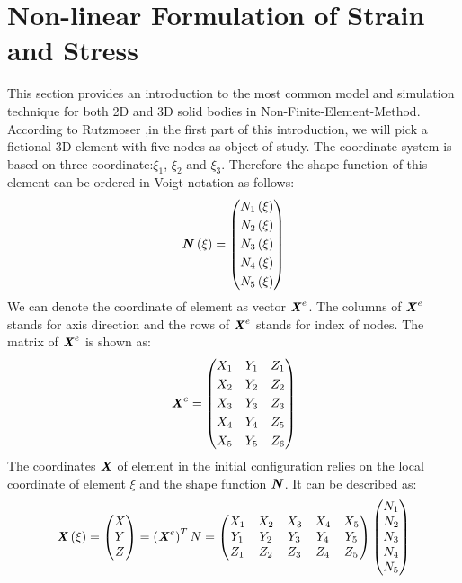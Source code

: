 \section{Non-linear Formulation of Strain and Stress}
This section provides an introduction to the most common model and simulation technique for both 2D and 3D solid bodies in Non-Finite-Element-Method. According to Rutzmoser \cite{Johannes} ,in the first part of this introduction, we will pick a fictional 3D element with five nodes as object of study. The coordinate system is based on three coordinate:$\xi_1$, $\xi_2$ and $\xi_3$. Therefore the shape function of this element can be ordered in Voigt notation as follows:
\begin{equation}
 \textbf{\textit{N}}\left(\xi\right) = \begin{pmatrix}
 N_1\left(\xi\right)           \\[0.3em]
 N_2\left(\xi\right)            \\[0.3em]
 N_3\left(\xi\right)           \\[0.3em]
 N_4\left(\xi\right)         \\[0.3em]
 N_5\left(\xi\right)                            
\end{pmatrix}
\end{equation}
We can denote the coordinate of element as vector $\textbf{\textit{X}}^e$. The columns of $\textbf{\textit{X}}^e$ stands for axis direction and the rows of $\textbf{\textit{X}}^e$ stands for index of nodes. The matrix of $\textbf{\textit{X}}^e$ is shown as:
\begin{equation}
\textbf{\textit{X}}^e = \begin{pmatrix}
X_1 & Y_1 & Z_1           \\[0.3em]
X_2 & Y_2 & Z_2             \\[0.3em]
X_3 & Y_3 & Z_3           \\[0.3em]
X_4 & Y_4 & Z_5          \\[0.3em]
X_5 & Y_5 & Z_6                            
\end{pmatrix}
\end{equation}	
The coordinates $\textbf{\textit{X}}$ of element in the initial configuration relies on the local coordinate of element $\xi$ and the shape function $\textbf{\textit{N}}$. It can be described as:
\begin{equation}
\textbf{\textit{X}}  \left(\xi\right) = \begin{pmatrix}
X \\
Y \\
Z
\end{pmatrix} = \left(\textbf{\textit{X}}^e\right)^T N = \begin{pmatrix}
X_1 & X_2 & X_3 & X_4 & X_5 \\
Y_1 & Y_2 & Y_3 & Y_4 & Y_5 \\
Z_1 & Z_2 & Z_3 & Z_4 & Z_5
\end{pmatrix} \begin{pmatrix}
N_1 \\
N_2 \\
N_3 \\
N_4 \\
N_5 
\end{pmatrix}
\end{equation} 
